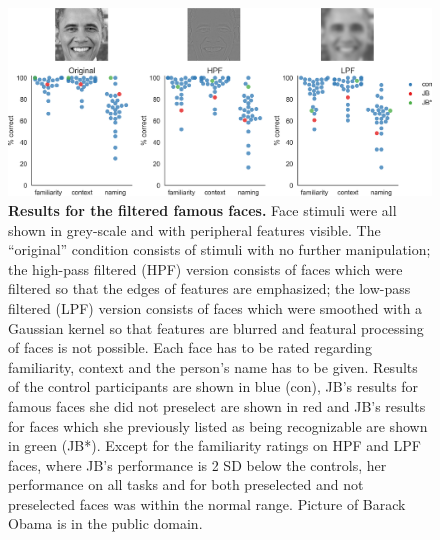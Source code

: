 \documentclass[fleqn,10pt]{SelfArx} %
\begin{document}
 \begin{figure}[htbp]
 	\begin{minipage}{\textwidth}
 		\renewcommand{\familydefault}{\sfdefault}\normalfont
 		\centering
 		\includegraphics[width=\columnwidth]{../reports/figures/filterface_main_figure_mod.png}
 		\vspace*{-3mm}
 		\caption{\textbf{Results for the filtered famous faces.} Face stimuli were all shown in grey-scale and with peripheral features visible. The “original” condition consists of stimuli with no further manipulation; the high-pass filtered (HPF) version consists of faces which were filtered so that the edges of features are emphasized; the low-pass filtered (LPF) version consists of faces which were smoothed with a Gaussian kernel so that features are blurred and featural processing of faces is not possible. Each face has to be rated regarding familiarity, context and the person's name has to be given. Results of the control participants are shown in blue (con), JB's results for famous faces she did not preselect are shown in red and JB's results for faces which she previously listed as being recognizable are shown in green (JB*). Except for the familiarity ratings on HPF and LPF faces, where JB's performance is 2 SD below the controls, her performance on all tasks and for both preselected and not preselected faces was within the normal range. Picture of Barack Obama is in the public domain.}%
 		\label{fig:filtered}
 	\end{minipage}
 \end{figure}
 
\end{document}
